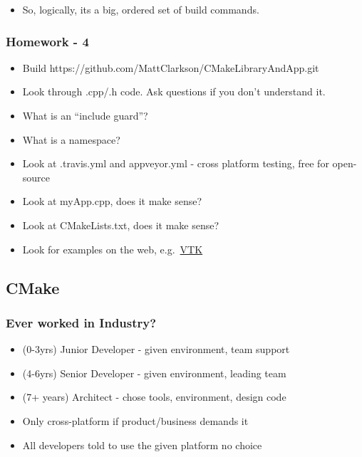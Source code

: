 \begin{itemize}
\tightlist
\item
  So, logically, its a big, ordered set of build commands.
\end{itemize}

\hypertarget{homework---4}{%
\subsubsection{Homework - 4}\label{homework---4}}

\begin{itemize}
\tightlist
\item
  Build https://github.com/MattClarkson/CMakeLibraryAndApp.git
\item
  Look through .cpp/.h code. Ask questions if you don't understand it.
\item
  What is an ``include guard''?
\item
  What is a namespace?
\item
  Look at .travis.yml and appveyor.yml - cross platform testing, free
  for open-source
\item
  Look at myApp.cpp, does it make sense?
\item
  Look at CMakeLists.txt, does it make sense?
\item
  Look for examples on the web,
  e.g.~\href{https://lorensen.github.io/VTKExamples/site/Cxx/GeometricObjects/Cone/}{VTK}
\end{itemize}

\hypertarget{cmake}{%
\subsection{CMake}\label{cmake}}

\hypertarget{ever-worked-in-industry}{%
\subsubsection{Ever worked in Industry?}\label{ever-worked-in-industry}}

\begin{itemize}
\tightlist
\item
  (0-3yrs) Junior Developer - given environment, team support
\item
  (4-6yrs) Senior Developer - given environment, leading team
\item
  (7+ years) Architect - chose tools, environment, design code
\item
  Only cross-platform if product/business demands it
\item
  All developers told to use the given platform no choice
\end{itemize}


